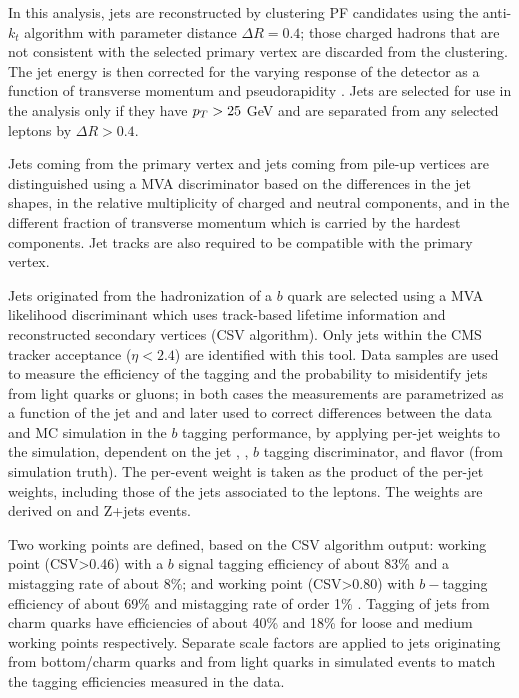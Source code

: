 In this analysis, jets are reconstructed by clustering PF candidates using the anti-$k_t$ algorithm with parameter distance $\Delta R=0.4$; those charged hadrons that are not consistent with the selected primary vertex are discarded from the clustering. The jet energy is then corrected for the varying response of the detector as a function of transverse momentum \pt and pseudorapidity \etac. Jets are selected for use in the analysis only if they have $p_T > 25$ GeV and are separated from any selected leptons by $\Delta R > 0.4$.

Jets coming from the primary vertex and jets coming from pile-up vertices are distinguished using a MVA discriminator based on the differences in the jet shapes, in the relative multiplicity of charged and neutral components, and in the different fraction of transverse momentum which is carried by the hardest components. Jet tracks are also required to be compatible with the primary
vertex.

Jets originated from the hadronization of a $b$ quark are selected using a MVA likelihood discriminant which uses track-based lifetime information and reconstructed secondary vertices (CSV algorithm). Only jets within the CMS tracker acceptance ($\eta < 2.4$) are identified with this tool. Data samples are used to measure the efficiency of the \bjet tagging and the probability to misidentify jets from light quarks or gluons; in both cases the measurements are parametrized as a function of the jet \pt and \etac and later used to correct differences between the data and MC simulation in the $b$ tagging performance, by applying per-jet weights to the simulation, dependent on the jet \pt, \etac, $b$ tagging discriminator, and flavor (from simulation truth)\cite{btag_corr}. The per-event weight is taken as the product of the per-jet weights, including those of the jets associated to the leptons. The weights are derived on \ttbar and Z+jets events.

Two working points are defined, based on the CSV algorithm output:  working point (CSV>0.46) with a $b$ signal tagging efficiency of about 83\% and a mistagging rate of about 8\%; and  working point (CSV>0.80) with $b-$tagging efficiency of about 69\% and mistagging rate of order 1\% \cite{btag_points}. Tagging of jets from charm quarks have efficiencies of about 40\%  and 18\% for loose and medium working points respectively. Separate scale factors are applied to jets originating from bottom/charm quarks and from light quarks in simulated events to match the tagging efficiencies measured in the data.
























